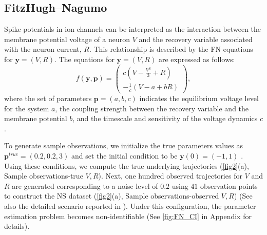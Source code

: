 \documentclass[letterpaper]{article} %
\theoremstyle{thmstyleone}%
\theoremstyle{thmstyletwo}%
\theoremstyle{thmstylethree}%
\begin{document}
\subsection{FitzHugh–Nagumo}
Spike potentials in ion channels can be interpreted as the interaction between the membrane potential voltage of a neuron $V$ and the recovery variable associated with the neuron current, $R$. This relationship is described by the FN equations for $\mathbf{y} =(V,R)$. The equations for $\mathbf{y}=(V,R)$ are expressed as follows:
\begin{equation*}f(\mathbf{y},\mathbf{p})=\begin{pmatrix} c\left(V-\frac{V^{3}}{3}+R\right) \\ -\frac{1}{c}\left(V-a+bR\right)\end{pmatrix},
\end{equation*}
where the set of parameters $\mathbf{p}=(a,b,c)$ indicates the equilibrium voltage level for the system $a$, the coupling strength between the recovery variable and the membrane potential $b$, and the timescale and sensitivity of the voltage dynamics $c$.

To generate sample observations, we initialize the true parameters values as $\mathbf{p}^{true}=(0.2,0.2,3)$ and set the initial condition to be $\mathbf{y}(0)=(-1,1)$ \cite{fitzhugh1961impulses}. Using these conditions, we compute the true underlying trajectories (\cref{fig2}(a), Sample observations-true $V, R$). Next, one hundred observed trajectories for $V$ and $R$ are generated corresponding to a noise level of $0.2$ using $41$ observation points to construct the NS dataset (\cref{fig2}(a), Sample observations-observed $V, R$) (See also the detailed scenario reported in \cite{dondelinger2013ode,wenk2019fast}). Under this configuration, the parameter estimation problem becomes non-identifiable (See \cref{fig:FN_CI} in Appendix for details).
\end{document}
